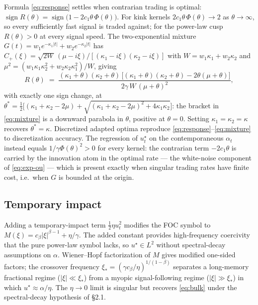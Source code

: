 \documentclass[11pt]{article}
\theoremstyle{plain}
\begin{document}
Formula \eqref{eq:response} settles when contrarian trading is optimal: $\operatorname{sign} R(\theta) = \operatorname{sign}\bigl(1 - 2c_1\theta\,\Phi(\theta)\bigr)$. For kink kernels $2c_1\theta\,\Phi(\theta)\to 2$ as $\theta\to\infty$, so every sufficiently fast signal is traded against; for the power-law cusp $R(\theta)>0$ at every signal speed. The two-exponential mixture $G(t) = w_1e^{-\kappa_1|t|}+w_2e^{-\kappa_2|t|}$ has $\hat C_+(\xi) = \sqrt{2W}\,(\mu-i\xi)/[(\kappa_1-i\xi)(\kappa_2-i\xi)]$ with $W = w_1\kappa_1+w_2\kappa_2$ and $\mu^2 = (w_1\kappa_1\kappa_2^2+w_2\kappa_2\kappa_1^2)/W$, giving
\begin{equation}\label{eq:mixture}
R(\theta) \;=\; \frac{(\kappa_1+\theta)(\kappa_2+\theta)\,\bigl[(\kappa_1+\theta)(\kappa_2+\theta) - 2\theta(\mu+\theta)\bigr]}{2\gamma\,W\,(\mu+\theta)^2},
\end{equation}
with exactly one sign change, at $\theta^* = \tfrac12\bigl[(\kappa_1+\kappa_2-2\mu) + \sqrt{(\kappa_1+\kappa_2-2\mu)^2+4\kappa_1\kappa_2}\bigr]$: the bracket in \eqref{eq:mixture} is a downward parabola in $\theta$, positive at $\theta=0$. Setting $\kappa_1=\kappa_2=\kappa$ recovers $\theta^*=\kappa$. Discretized adapted optima reproduce \eqref{eq:response}--\eqref{eq:mixture} to discretization accuracy. The regression of $u^\star_t$ on the contemporaneous $\alpha_t$ instead equals $1/\gamma\Phi(\theta)^2 > 0$ for every kernel: the contrarian term $-2c_1\theta$ is carried by the innovation atom in the optimal rate --- the white-noise component of \eqref{eq:exp-ou} --- which is present exactly when singular trading rates have finite cost, i.e.\ when $G$ is bounded at the origin.

\subsection{Temporary impact}

Adding a temporary-impact term $\tfrac12\eta u_t^2$ modifies the FOC symbol to $M(\xi) = c_\beta|\xi|^{\beta-1}+\eta/\gamma$. The added constant provides high-frequency coercivity that the pure power-law symbol lacks, so $u^\star\in L^2$ without spectral-decay assumptions on $\alpha$. Wiener--Hopf factorization of $M$ gives modified one-sided factors; the crossover frequency $\xi_* = (\gamma c_\beta/\eta)^{1/(1-\beta)}$ separates a long-memory fractional regime ($|\xi|\ll\xi_*$) from a myopic signal-following regime ($|\xi|\gg\xi_*$) in which $u^\star\approx\alpha/\eta$. The $\eta\to 0$ limit is singular but recovers \eqref{eq:bulk} under the spectral-decay hypothesis of \S2.1.
\end{document}
